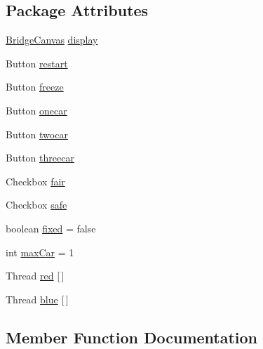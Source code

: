 \subsection*{Package Attributes}
\begin{DoxyCompactItemize}
\item 
\mbox{\hyperlink{classconcurrency_1_1bridge_1_1_bridge_canvas}{Bridge\+Canvas}} \mbox{\hyperlink{classconcurrency_1_1bridge_1_1_single_lane_bridge_a9e5dd77ddd8d067890e37bdb92bcb5e5}{display}}
\item 
Button \mbox{\hyperlink{classconcurrency_1_1bridge_1_1_single_lane_bridge_ad2e50f105be9d4a771650080d1aa586f}{restart}}
\item 
Button \mbox{\hyperlink{classconcurrency_1_1bridge_1_1_single_lane_bridge_ae038eac0222c7e87f00367f7dad2ff77}{freeze}}
\item 
Button \mbox{\hyperlink{classconcurrency_1_1bridge_1_1_single_lane_bridge_a24f20b97d3e6eac70eee68a5b9a41edb}{onecar}}
\item 
Button \mbox{\hyperlink{classconcurrency_1_1bridge_1_1_single_lane_bridge_a3e064007da160275ffe29557a2097a4a}{twocar}}
\item 
Button \mbox{\hyperlink{classconcurrency_1_1bridge_1_1_single_lane_bridge_ae901031a7ed238a83f5bff437b2dfc93}{threecar}}
\item 
Checkbox \mbox{\hyperlink{classconcurrency_1_1bridge_1_1_single_lane_bridge_ae84cba52e0dfed9d908460163017ddfb}{fair}}
\item 
Checkbox \mbox{\hyperlink{classconcurrency_1_1bridge_1_1_single_lane_bridge_ac9b96efc9ee7a95fb5b71c166dc4ced5}{safe}}
\item 
boolean \mbox{\hyperlink{classconcurrency_1_1bridge_1_1_single_lane_bridge_a40275814ea4d9160ab1f700ca4154eb7}{fixed}} = false
\item 
int \mbox{\hyperlink{classconcurrency_1_1bridge_1_1_single_lane_bridge_ae8bd96d4cf6d5d7b71ad0acbe1bba3df}{max\+Car}} = 1
\item 
Thread \mbox{\hyperlink{classconcurrency_1_1bridge_1_1_single_lane_bridge_a17e1de5011188dd8038e1960b5679f36}{red}} \mbox{[}$\,$\mbox{]}
\item 
Thread \mbox{\hyperlink{classconcurrency_1_1bridge_1_1_single_lane_bridge_ad315140555d509cea539e61ae896a16d}{blue}} \mbox{[}$\,$\mbox{]}
\end{DoxyCompactItemize}


\subsection{Member Function Documentation}
\mbox{\label{classconcurrency_1_1bridge_1_1_single_lane_bridge_a7e263daa87373f5eddda5822184c882e}} 
